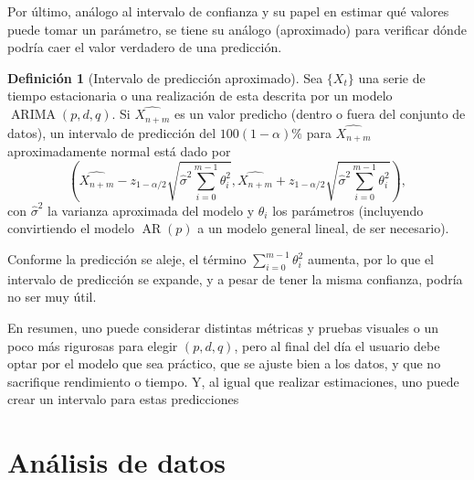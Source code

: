 \documentclass[11pt,letterpaper]{article}
\newcommand{\AR}{\ensuremath{\operatorname{AR}}}
\newcommand{\ARIMA}{\ensuremath{\operatorname{ARIMA}}}
\theoremstyle{definition}
\newtheorem{definition}{Definición}[section]
\theoremstyle{theorem}
\theoremstyle{remark}
\begin{document}
	Por último, análogo al intervalo de confianza y su papel en estimar qué valores puede tomar un parámetro, se tiene su análogo (aproximado) para verificar dónde podría caer el valor verdadero de una predicción.
	\begin{definition}[Intervalo de predicción aproximado]
		Sea \(\{X_t\}\) una serie de tiempo estacionaria o una realización de esta descrita por un modelo \(\ARIMA(p,d,q)\). Si \(\hat{X_{n+m}}\) es un valor predicho (dentro o fuera del conjunto de datos), un intervalo de predicción del \(100(1-\alpha)\%\) para \(\hat{X_{n+m}}\) aproximadamente normal está dado por \[\left(\hat{X_{n+m}}-z_{1-\alpha/2}\sqrt{\hat{\sigma}^2\sum_{i=0}^{m-1}\theta_i^2},\hat{X_{n+m}}+z_{1-\alpha/2}\sqrt{\hat {\sigma}^2\sum_{i=0}^{m-1}\theta_i^2}\right),\] con \(\hat{\sigma}^2\) la varianza aproximada del modelo y \(\theta_i\) los parámetros (incluyendo convirtiendo el modelo \(\AR(p)\) a un modelo general lineal, de ser necesario).
	\end{definition}
	Conforme la predicción se aleje, el término \(\sum_{i=0}^{m-1}\theta_i^2\) aumenta, por lo que el intervalo de predicción se expande, y a pesar de tener la misma confianza, podría no ser muy útil. \par
	En resumen, uno puede considerar distintas métricas y pruebas visuales o un poco más rigurosas para elegir \((p,d,q)\), pero al final del día el usuario debe optar por el modelo que sea práctico, que se ajuste bien a los datos, y que no sacrifique rendimiento o tiempo. Y, al igual que realizar estimaciones, uno puede crear un intervalo para estas predicciones
	\clearpage
	\section{Análisis de datos}
\end{document}
